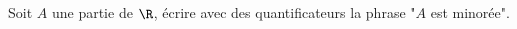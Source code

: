 Soit $A$ une partie de $\R$, \'{e}crire avec des quantificateurs la phrase "$A$ est minor\'ee".\bigskip \bigskip